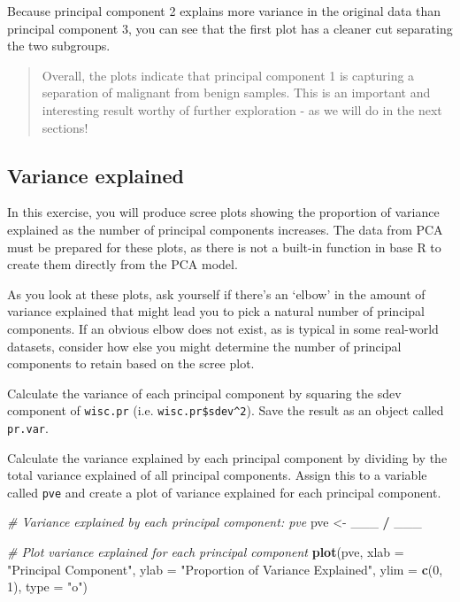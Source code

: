 \documentclass[]{article}
\newenvironment{Shaded}{\begin{snugshade}}{\end{snugshade}}
\newcommand{\KeywordTok}[1]{\textcolor[rgb]{0.13,0.29,0.53}{\textbf{#1}}}
\newcommand{\DataTypeTok}[1]{\textcolor[rgb]{0.13,0.29,0.53}{#1}}
\newcommand{\DecValTok}[1]{\textcolor[rgb]{0.00,0.00,0.81}{#1}}
\newcommand{\StringTok}[1]{\textcolor[rgb]{0.31,0.60,0.02}{#1}}
\newcommand{\CommentTok}[1]{\textcolor[rgb]{0.56,0.35,0.01}{\textit{#1}}}
\newcommand{\OperatorTok}[1]{\textcolor[rgb]{0.81,0.36,0.00}{\textbf{#1}}}
\newcommand{\NormalTok}[1]{#1}
\begin{document}
Because principal component 2 explains more variance in the original
data than principal component 3, you can see that the first plot has a
cleaner cut separating the two subgroups.

\begin{quote}
Overall, the plots indicate that principal component 1 is capturing a
separation of malignant from benign samples. This is an important and
interesting result worthy of further exploration - as we will do in the
next sections!
\end{quote}

\subsection{Variance explained}\label{variance-explained}

In this exercise, you will produce scree plots showing the proportion of
variance explained as the number of principal components increases. The
data from PCA must be prepared for these plots, as there is not a
built-in function in base R to create them directly from the PCA model.

As you look at these plots, ask yourself if there's an `elbow' in the
amount of variance explained that might lead you to pick a natural
number of principal components. If an obvious elbow does not exist, as
is typical in some real-world datasets, consider how else you might
determine the number of principal components to retain based on the
scree plot.

Calculate the variance of each principal component by squaring the sdev
component of \texttt{wisc.pr} (i.e. \texttt{wisc.pr\$sdev\^{}2}). Save
the result as an object called \texttt{pr.var}.

Calculate the variance explained by each principal component by dividing
by the total variance explained of all principal components. Assign this
to a variable called \texttt{pve} and create a plot of variance
explained for each principal component.

\begin{Shaded}
\begin{Highlighting}[]
\CommentTok{# Variance explained by each principal component: pve}
\NormalTok{pve <-}\StringTok{ }\NormalTok{___ }\OperatorTok{/}\StringTok{ }\NormalTok{___}

\CommentTok{# Plot variance explained for each principal component}
\KeywordTok{plot}\NormalTok{(pve, }\DataTypeTok{xlab =} \StringTok{"Principal Component"}\NormalTok{, }
     \DataTypeTok{ylab =} \StringTok{"Proportion of Variance Explained"}\NormalTok{, }
     \DataTypeTok{ylim =} \KeywordTok{c}\NormalTok{(}\DecValTok{0}\NormalTok{, }\DecValTok{1}\NormalTok{), }\DataTypeTok{type =} \StringTok{"o"}\NormalTok{)}
\end{Highlighting}
\end{Shaded}
\end{document}
